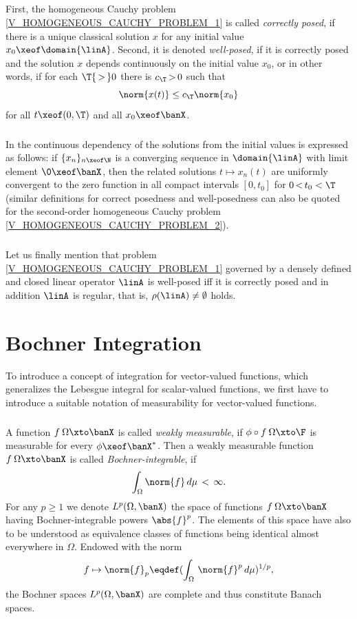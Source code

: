\documentclass[11pt,twoside]{article}
\begin{document}
\subparagraph{} %
First,
the homogeneous Cauchy problem \eqref{V_HOMOGENEOUS_CAUCHY_PROBLEM_1}
is called \textit{correctly posed},
if there is a unique classical solution $x$
for any initial value $x_0 \xeof \domain{\linA}$.
Second,
it is denoted \textit{well-posed},
if it is correctly posed and
the solution $x$ depends continuously on the initial value $x_0$,
or in other words,
if for each $\T {\,>\,} 0$ there is $c_{\T} {\,>\,} 0$ such that
\[
\norm{x(t)} \leq c_{\T} \norm{x_0}
\]
for all $t \xeof (0,\T)$ and all $x_0 \xeof \banX$.

\subparagraph{}
In \cite{V_EN}
the continuous dependency of the solutions from the initial values
is expressed as follows:
if $\{x_n\}_{n \xeof \N}$ is a converging sequence in $\domain{\linA}$
with limit element $\0 \xeof \banX$,
then the related solutions $t \mapsto x_n(t)$ are uniformly convergent
to the zero function in all compact intervals $[0,t_0]$
for $0 {\,<\,} t_0 < \T$
(similar definitions for correct posedness and well-posedness
can also be quoted for the second-order homogeneous Cauchy problem
\eqref{V_HOMOGENEOUS_CAUCHY_PROBLEM_2}).

\subparagraph{}
Let us finally mention that problem \eqref{V_HOMOGENEOUS_CAUCHY_PROBLEM_1}
governed by a densely defined and closed linear operator $\linA$ is well-posed
iff
it is correctly posed and
in addition $\linA$ is regular,
that is,
$\rho(\linA) \ne \emptyset$ holds.

\section{Bochner Integration}
To introduce a concept of integration for vector-valued functions,
which generalizes the Lebesgue integral for scalar-valued functions,
we first have to introduce a suitable notation of measurability 
for vector-valued functions.

\subparagraph{} %
A function $f\:\Omega \xto \banX$ is called \textit{weakly measurable},
if $\phi \circ f\:\Omega \xto \F$ is measurable for every $\phi \xeof \banX^*$.
Then a weakly measurable function $f\:\Omega \xto \banX$
is called \textit{Bochner-integrable},
if
\[
\int_{\Omega} \norm{f} \,d\mu \, < \, \infty.
\]
For any $p \geq 1$
we denote $L^p(\Omega,\banX)$ the space of functions $f\:\Omega \xto \banX$
having Bochner-integrable powers $\abs{f} ^{p}$.
The elements of this space have also to be understood
as equivalence classes of functions
being identical almost everywhere in $\Omega$.
Endowed with the norm
\[
f \mapsto \norm{f}_p \eqdef (\int_{\Omega} \, \norm{f} ^p \, d\mu)^{1/p},
\]
the Bochner spaces $L^p(\Omega,\banX)$ are complete
and thus constitute Banach spaces.
\end{document}
